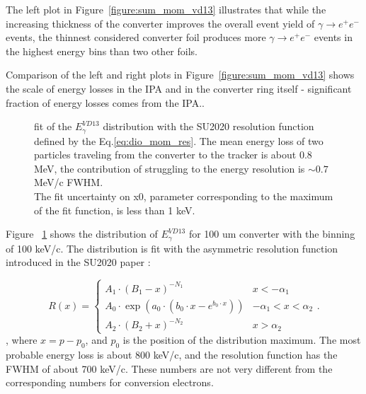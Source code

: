 The left plot in Figure~\ref{figure:sum_mom_vd13} illustrates that while the increasing
thickness of the converter improves the overall event yield of $\gamma \to e^+e^-$ events,
the thinnest considered converter foil produces more $\gamma \to e^+e^-$ events in the highest
energy bins than two other foils.

Comparison of the left and right plots in Figure~\ref{figure:sum_mom_vd13} shows the scale of energy
losses in the IPA and in the converter ring itself - significant fraction of energy losses comes
from the IPA..

\begin{figure}[H]
  \caption{
    \label{figure:00083}
    fit of the $E_\gamma^{VD13}$ distribution with the SU2020 resolution function defined by
    the Eq.\ref{eq:dio_mom_res}.
    The mean energy loss of two particles traveling from the converter to the tracker is about 0.8 MeV,
    the contribution of struggling to the energy resolution is $\sim 0.7$ MeV/c FWHM. \\
    The fit uncertainty on x0, parameter corresponding to the maximum of the fit function,
    is less than 1 keV.
  }
\end{figure}

Figure ~\ref{figure:00083} shows the distribution of $E_\gamma^{VD13}$
for 100 um converter with the binning of 100 keV/c. The distribution is fit
with the asymmetric resolution function introduced in the SU2020 paper \cite{MU2E_SU2020_PAPER}:

\begin{equation}
  \label{eq:dio_mom_res}
  R(x) =
 \begin{cases}
    A_1 \cdot (B_1-x)^{-N_1}                                 & x < -\alpha_1 \\
    A_0 \cdot \exp (a_0 \cdot (b_0 \cdot x - e^{b_0 \cdot x})) & -\alpha_1< x < \alpha_2 \\
    A_2 \cdot (B_2+x)^{-N_2}                                 &  x > \alpha_2
  \end{cases}.
\end{equation}
, where $x = p-p_0$, and $p_0$ is the position of the distribution maximum.
The most probable energy loss is about 800 keV/c, 
and the resolution function has the FWHM of about 700 keV/c.
These numbers are not very different from the corresponding numbers for conversion electrons.

